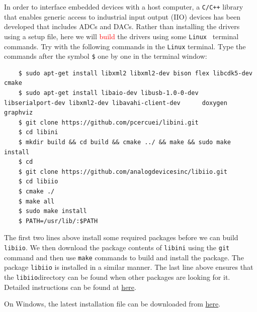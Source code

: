 \documentclass[11pt]{article}
\begin{document}
In order to interface embedded devices with a host computer, a \texttt{C/C++} library that enables generic access to industrial input output (IIO) devices has been developed that includes ADCs and DACs. Rather than installing the drivers using a setup file, here we will \textcolor{red}{build} the drivers using some \texttt{Linux } terminal commands. Try with the following commands in the \texttt{Linux} terminal. Type the commands after the symbol \texttt{\$} one by one in the terminal window:
\begin{mdframed}[backgroundcolor=gray!20]
  \tiny
  \begin{verbatim}
    $ sudo apt-get install libxml2 libxml2-dev bison flex libcdk5-dev cmake
    $ sudo apt-get install libaio-dev libusb-1.0-0-dev      libserialport-dev libxml2-dev libavahi-client-dev      doxygen graphviz
    $ git clone https://github.com/pcercuei/libini.git
    $ cd libini
    $ mkdir build && cd build && cmake ../ && make && sudo make install
    $ cd 
    $ git clone https://github.com/analogdevicesinc/libiio.git
    $ cd libiio
    $ cmake ./
    $ make all
    $ sudo make install
    $ PATH=/usr/lib/:$PATH
  \end{verbatim}
\end{mdframed}

The first two lines above install some required packages before we can build \texttt{libiio}. We then download the package contents of \texttt{libini} using the \texttt{git} command and then use \texttt{make} commands to build and install the package. The package \texttt{libiio} is installed in a similar manner. The last line above ensures that the \texttt{libiio}directory can be found when other packages are looking for it. Detailed instructions can be found at \href{https://wiki.analog.com/resources/tools-software/linux-software/libiio}{here}.

\begin{tcolorbox}[colback=blue!5]
  On Windows, the latest installation file can be downloaded from \href{https://github.com/analogdevicesinc/libiio/releases}{here}.
\end{tcolorbox}
\end{document}
